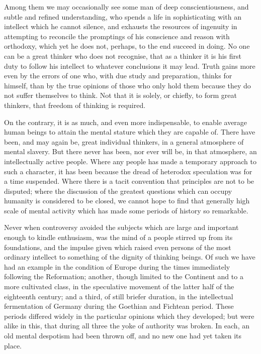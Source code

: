 Among them we may occasionally see some man of deep conscientiousness, and subtle and refined understanding, who spends a life in sophisticating with an intellect which he cannot silence, and exhausts the resources of ingenuity in attempting to reconcile the promptings of his conscience and reason with orthodoxy, which yet he does not, perhaps, to the end succeed in doing. No one can be a great thinker who does not recognise, that as a thinker it is his first duty to follow his intellect to whatever conclusions it may lead. Truth gains more even by the errors of one who, with due study and preparation, thinks for himself, than by the true opinions of those who only hold them because they do not suffer themselves to think. Not that it is solely, or chiefly, to form great thinkers, that freedom of thinking is required.\par

On the contrary, it is as much, and even more indispensable, to enable average human beings to attain the mental stature which they are capable of. There have been, and may again be, great individual thinkers, in a general atmosphere of mental slavery. But there never has been, nor ever will be, in that atmosphere, an intellectually active people. Where any people has made a temporary approach to such a character, it has been because the dread of heterodox speculation was for a time suspended. Where there is a tacit convention that principles are not to be disputed; where the discussion of the greatest questions which can occupy humanity is considered to be closed, we cannot hope to find that generally high scale of mental activity which has made some periods of history so remarkable.\par

Never when controversy avoided the subjects which are large and important enough to kindle enthusiasm, was the mind of a people stirred up from its foundations, and the impulse given which raised even persons of the most ordinary intellect to something of the dignity of thinking beings. Of such we have had an example in the condition of Europe during the times immediately following the Reformation; another, though limited to the Continent and to a more cultivated class, in the speculative movement of the latter half of the eighteenth century; and a third, of still briefer duration, in the intellectual fermentation of Germany during the Goethian and Fichtean period. These periods differed widely in the particular opinions which they developed; but were alike in this, that during all three the yoke of authority was broken. In each, an old mental despotism had been thrown off, and no new one had yet taken its place.\par

